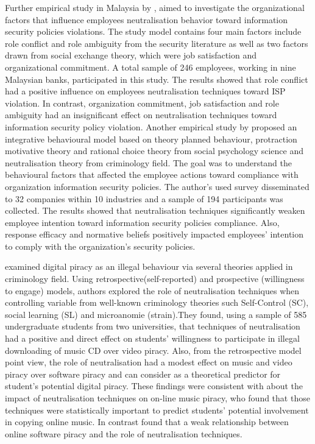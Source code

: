 Further empirical study in Malaysia by \citet{Teh2015}, aimed to investigate the organizational factors that influence employees neutralisation behavior toward information security policies violations. The study model contains four main factors include role conflict and role ambiguity from the security literature as well as two factors drawn from social exchange theory, which were job satisfaction and organizational commitment. A total sample of 246 employees, working in nine Malaysian banks, participated in this study. The results showed that role conflict had a positive influence on employees neutralisation techniques toward ISP violation. In contrast, organization commitment, job satisfaction and role ambiguity had an insignificant effect on neutralisation techniques toward information security policy violation.
Another empirical study by\citet{Kim2014} proposed an integrative behavioural model based on theory planned behaviour, protraction motivative theory and rational choice theory from social psychology science and neutralisation theory from criminology field. The goal was to understand the behavioural factors that affected the employee actions toward compliance with organization information security policies. The author's used survey disseminated to 32 companies within 10 industries and a sample of 194 participants was collected. The results showed that neutralisation techniques significantly weaken employee intention toward information security policies compliance. Also, response efficacy and normative beliefs positively impacted employees’ intention to comply with the organization’s security policies.

\citet{Morris} examined digital piracy as an illegal behaviour via several theories applied in criminology field. Using retrospective(self-reported) and prospective (willingness to engage) models, authors explored the role of neutralisation techniques when controlling variable from well-known criminology theories such Self-Control (SC), social learning (SL) and microanomie (strain).They found, using a sample of 585 undergraduate students from two universities, that techniques of neutralisation had a positive and direct effect on students' willingness to participate in illegal downloading of music CD over video piracy. Also, from the retrospective model point view, the role of neutralisation had a modest effect on music and video piracy over software piracy and can consider as a theoretical predictor for student’s potential digital piracy. These findings were consistent with \cite{Ingram2008} about the impact of neutralisation techniques on on-line music piracy, who found that those techniques were statistically important to predict students’ potential involvement in copying online music. In contrast \cite{Hinduja2007} found that a weak relationship between online software piracy and the role of neutralisation techniques. 
    
